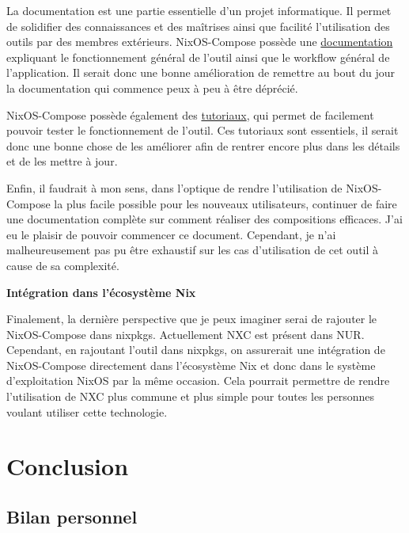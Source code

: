 \documentclass[a4paper,french,12pt, titlepage]{article}
\begin{document}
La documentation est une partie essentielle d'un projet informatique. Il
permet de solidifier des connaissances et des maîtrises ainsi que
facilité l'utilisation des outils par des membres extérieurs.
NixOS-Compose possède une
\href{https://nixos-compose.gitlabpages.inria.fr/nixos-compose/}{documentation}
expliquant le fonctionnement général de l'outil ainsi que le workflow
général de l'application. Il serait donc une bonne amélioration de
remettre au bout du jour la documentation qui commence peux à peu à être
déprécié.\newline

NixOS-Compose possède également des
\href{https://gitlab.inria.fr/nixos-compose/tuto-nxc}{tutoriaux}, qui
permet de facilement pouvoir tester le fonctionnement de l'outil. Ces
tutoriaux sont essentiels, il serait donc une bonne chose de les
améliorer afin de rentrer encore plus dans les détails et de les mettre
à jour. \newline

Enfin, il faudrait à mon sens, dans l'optique de rendre l'utilisation de
NixOS-Compose la plus facile possible pour les nouveaux utilisateurs,
continuer de faire une documentation complète sur comment réaliser des
compositions efficaces. J'ai eu le plaisir de pouvoir commencer ce
document. Cependant, je n'ai malheureusement pas pu être exhaustif sur
les cas d'utilisation de cet outil à cause de sa complexité.\newline

\textbf{Intégration dans l'écosystème Nix}\newline

Finalement, la dernière perspective que je peux imaginer serai de
rajouter le NixOS-Compose dans nixpkgs. Actuellement NXC est présent
dans NUR. Cependant, en rajoutant l'outil dans nixpkgs, on assurerait
une intégration de NixOS-Compose directement dans l'écosystème Nix et
donc dans le système d'exploitation NixOS par la même occasion. Cela
pourrait permettre de rendre l'utilisation de NXC plus commune et plus
simple pour toutes les personnes voulant utiliser cette
technologie.\newline

\newpage

\hypertarget{conclusion}{%
\section{Conclusion}\label{conclusion}}

\hypertarget{bilan-personnel}{%
\subsection{Bilan personnel}\label{bilan-personnel}}
\end{document}

